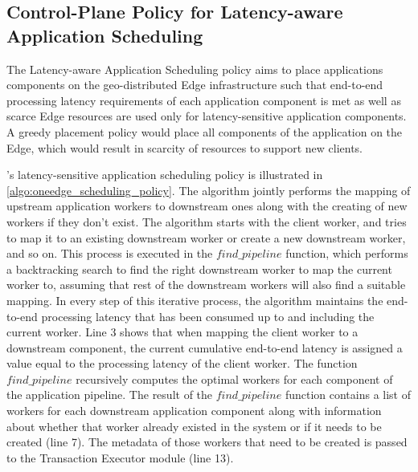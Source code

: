 \subsection{Control-Plane Policy for Latency-aware Application Scheduling}
\label{sec:oneedge_latency_aware_placement}
The Latency-aware Application Scheduling policy aims to place applications components on the geo-distributed Edge infrastructure such that end-to-end processing latency requirements of each application component is met as well as scarce Edge resources are used only for latency-sensitive application components. A greedy placement policy would place all components of the application on the Edge, which would result in scarcity of resources to support new clients.
\par \oneedge{}'s latency-sensitive application scheduling policy is illustrated in \cref{algo:oneedge_scheduling_policy}. The algorithm jointly performs the mapping of upstream application workers to downstream ones along with the creating of new workers if they don't exist. The algorithm starts with the client worker, and tries to map it to an existing downstream worker or create a new downstream worker, and so on. This process is executed in the $find\_pipeline$ function, which performs a backtracking search to find the right downstream worker to map the current worker to, assuming that rest of the downstream workers will also find a suitable mapping. In every step of this iterative process, the algorithm maintains the end-to-end processing latency that has been consumed
up to and including the current worker. Line 3 shows that when mapping the client worker to a downstream component, the current cumulative end-to-end latency is assigned a value equal to the processing latency of the client worker. The function $find\_pipeline$ recursively computes the optimal workers for each component of the application pipeline. The result of the $find\_pipeline$ function contains a list of workers for each downstream application component along with information about whether that worker already existed in the system or if it needs to be created (line 7). The metadata of those workers that need to be created is passed to the Transaction Executor module (line 13).

